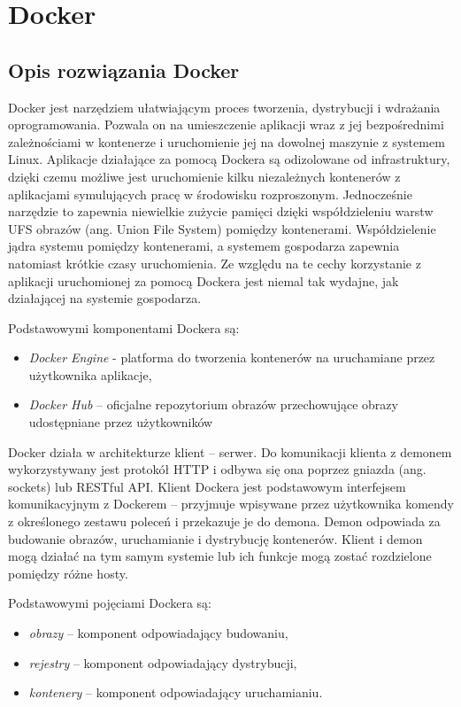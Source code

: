 \chapter{Docker}

\section{Opis rozwiązania Docker}

Docker jest narzędziem ułatwiającym proces tworzenia, dystrybucji i wdrażania oprogramowania. Pozwala on na umieszczenie aplikacji wraz z jej bezpośrednimi zależnościami w kontenerze i uruchomienie jej na dowolnej maszynie z systemem Linux. Aplikacje działające za pomocą Dockera są odizolowane od infrastruktury, dzięki czemu możliwe jest uruchomienie kilku niezależnych kontenerów z aplikacjami symulujących pracę w środowisku rozproszonym. Jednocześnie narzędzie to zapewnia niewielkie zużycie pamięci dzięki współdzieleniu warstw UFS obrazów (ang. Union File System) pomiędzy kontenerami. Współdzielenie jądra systemu pomiędzy kontenerami, a systemem gospodarza zapewnia natomiast krótkie czasy uruchomienia. Ze względu na te cechy korzystanie z aplikacji uruchomionej za pomocą Dockera jest niemal tak wydajne, jak działającej na systemie gospodarza.

	Podstawowymi komponentami Dockera są:
\begin{itemize}
\item \textit{Docker Engine} -  platforma do tworzenia kontenerów na uruchamiane przez użytkownika aplikacje,
\item \textit{Docker Hub} – oficjalne repozytorium obrazów przechowujące obrazy udostępniane przez użytkowników
\end{itemize}

	Docker działa w architekturze klient – serwer. Do komunikacji klienta z demonem wykorzystywany jest protokół HTTP i odbywa się ona poprzez gniazda (ang. sockets) lub RESTful API. Klient Dockera jest podstawowym interfejsem komunikacyjnym z Dockerem – przyjmuje wpisywane przez użytkownika komendy z określonego zestawu poleceń i przekazuje je do demona. Demon odpowiada za budowanie obrazów, uruchamianie i dystrybucję kontenerów. Klient i demon mogą działać na tym samym systemie lub ich funkcje mogą zostać rozdzielone pomiędzy różne hosty.

Podstawowymi pojęciami Dockera są:
\begin{itemize}
\item \textit{obrazy} – komponent  odpowiadający budowaniu,
\item \textit{rejestry} – komponent odpowiadający dystrybucji,
\item \textit{kontenery} – komponent odpowiadający uruchamianiu.
\end{itemize}

